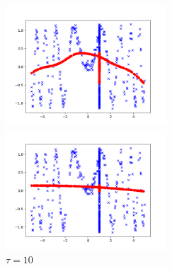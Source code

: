 \begin{answer}
\begin{figure}[htbp]
\begin{minipage}[t]{0.48\textwidth}
            \caption{$\tau = 0.5$}
        \end{minipage}
        \begin{minipage}[t]{0.48\textwidth}
            \centering
            \includegraphics[width=6cm]{../src/output/p05c_5.png}
            \caption{$\tau = 1$}
        \end{minipage}
        \begin{minipage}[t]{0.48\textwidth}
            \centering
            \includegraphics[width=6cm]{../src/output/p05c_6.png}
            \caption{$\tau = 10$}
        \end{minipage}
    \end{figure}
\end{answer}
